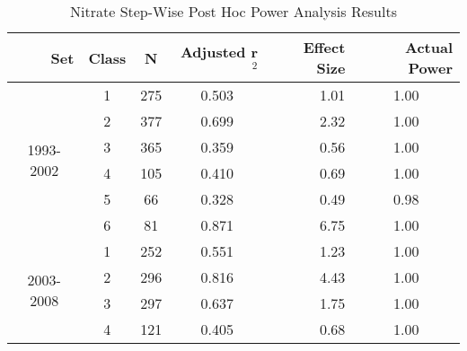 \begin{table}[htbp]
  \centering
	\caption{Nitrate Step-Wise Post Hoc Power Analysis Results}
    \begin{tabular}{rrcrrr}
    \toprule
    Set   & Class & N     & Adjusted r$^2$ & Effect Size & Actual Power \\
    \midrule
    \multicolumn{1}{c}{\multirow{6}[1]{*}{\begin{sideways}1993-2002\end{sideways}}} & \multicolumn{1}{c}{1} & \multicolumn{1}{c}{275} & \multicolumn{1}{c}{0.503 } & \multicolumn{1}{r}{1.01 } & \multicolumn{1}{c}{1.00 } \\
    \multicolumn{1}{c}{} & \multicolumn{1}{c}{2} & \multicolumn{1}{c}{377} & \multicolumn{1}{c}{0.699 } & \multicolumn{1}{r}{2.32 } & \multicolumn{1}{c}{1.00 } \\
    \multicolumn{1}{c}{} & \multicolumn{1}{c}{3} & \multicolumn{1}{c}{365} & \multicolumn{1}{c}{0.359 } & \multicolumn{1}{r}{0.56 } & \multicolumn{1}{c}{1.00 } \\
    \multicolumn{1}{c}{} & \multicolumn{1}{c}{4} & \multicolumn{1}{c}{105} & \multicolumn{1}{c}{0.410 } & \multicolumn{1}{r}{0.69 } & \multicolumn{1}{c}{1.00 } \\
    \multicolumn{1}{c}{} & \multicolumn{1}{c}{5} & \multicolumn{1}{c}{66} & \multicolumn{1}{c}{0.328 } & \multicolumn{1}{r}{0.49 } & \multicolumn{1}{c}{0.98 } \\
    \multicolumn{1}{c}{} & \multicolumn{1}{c}{6} & \multicolumn{1}{c}{81} & \multicolumn{1}{c}{0.871 } & \multicolumn{1}{r}{6.75 } & \multicolumn{1}{c}{1.00 } \\\midrule
    \multicolumn{1}{c}{\multirow{6}[2]{*}{\begin{sideways}2003-2008\end{sideways}}} & \multicolumn{1}{c}{1} & \multicolumn{1}{c}{252} & \multicolumn{1}{c}{0.551 } & \multicolumn{1}{r}{1.23 } & \multicolumn{1}{c}{1.00 } \\
    \multicolumn{1}{c}{} & \multicolumn{1}{c}{2} & \multicolumn{1}{c}{296} & \multicolumn{1}{c}{0.816 } & \multicolumn{1}{r}{4.43 } & \multicolumn{1}{c}{1.00 } \\
    \multicolumn{1}{c}{} & \multicolumn{1}{c}{3} & \multicolumn{1}{c}{297} & \multicolumn{1}{c}{0.637 } & \multicolumn{1}{r}{1.75 } & \multicolumn{1}{c}{1.00 } \\
    \multicolumn{1}{c}{} & \multicolumn{1}{c}{4} & \multicolumn{1}{c}{121} & \multicolumn{1}{c}{0.405 } & \multicolumn{1}{r}{0.68 } & \multicolumn{1}{c}{1.00 } \\

\end{tabular}
\end{table}
